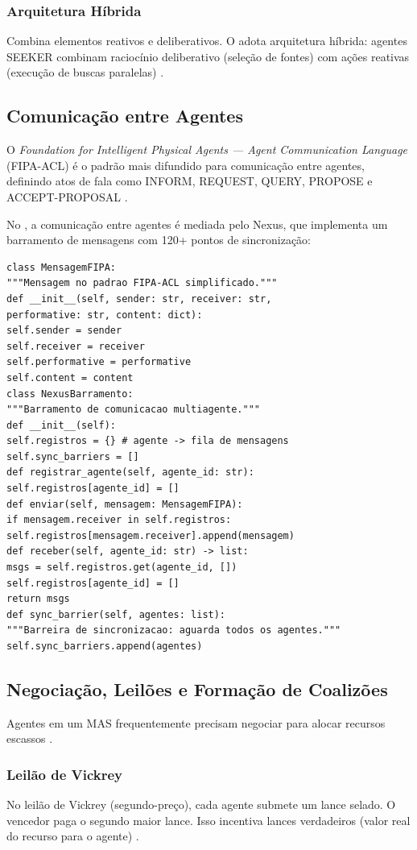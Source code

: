 \subsubsection*{Arquitetura Híbrida}
Combina elementos reativos e deliberativos. O \opencodeeco{} adota
arquitetura híbrida: agentes SEEKER combinam raciocínio deliberativo
(seleção de fontes) com ações reativas (execução de buscas paralelas)
\cite{opencode2026seeker}.
\subsection{Comunicação entre Agentes}
\begin{definicao}
O \textit{Foundation for Intelligent Physical Agents --- Agent Communication
Language} (FIPA-ACL) é o padrão mais difundido para comunicação entre
agentes, definindo atos de fala como INFORM, REQUEST, QUERY, PROPOSE e
ACCEPT-PROPOSAL \cite{wooldridge2009multiagent}.
\end{definicao}
No \opencodeeco{}, a comunicação entre agentes é mediada pelo Nexus, que
implementa um barramento de mensagens com 120+ pontos de sincronização:
\begin{lstlisting}[style=pythonstyle]
class MensagemFIPA:
"""Mensagem no padrao FIPA-ACL simplificado."""
def __init__(self, sender: str, receiver: str,
performative: str, content: dict):
self.sender = sender
self.receiver = receiver
self.performative = performative
self.content = content
class NexusBarramento:
"""Barramento de comunicacao multiagente."""
def __init__(self):
self.registros = {} # agente -> fila de mensagens
self.sync_barriers = []
def registrar_agente(self, agente_id: str):
self.registros[agente_id] = []
def enviar(self, mensagem: MensagemFIPA):
if mensagem.receiver in self.registros:
self.registros[mensagem.receiver].append(mensagem)
def receber(self, agente_id: str) -> list:
msgs = self.registros.get(agente_id, [])
self.registros[agente_id] = []
return msgs
def sync_barrier(self, agentes: list):
"""Barreira de sincronizacao: aguarda todos os agentes."""
self.sync_barriers.append(agentes)
\end{lstlisting}
\subsection{Negociação, Leilões e Formação de Coalizões}
Agentes em um MAS frequentemente precisam negociar para alocar recursos
escassos \cite{weiss2013multiagent, shoham2023multiagent}.
\subsubsection*{Leilão de Vickrey}
No leilão de Vickrey (segundo-preço), cada agente submete um lance
selado. O vencedor paga o segundo maior lance. Isso incentiva lances
verdadeiros (valor real do recurso para o agente) \cite{shoham2023multiagent}.
